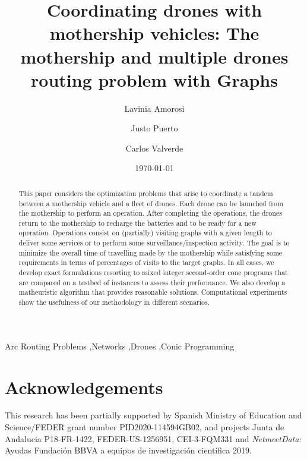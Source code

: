 \documentclass[10pt,a4paper]{elsarticle}
\title{Coordinating drones with mothership vehicles: The mothership and multiple drones routing problem with Graphs}
\author[1]{Lavinia Amorosi\corref{cor1}}
\author[2]{Justo Puerto\corref{cor1}}
\author[2]{Carlos Valverde\corref{cor1}}
\date{\today}
\newcommand{\CV}[1]{{\color{atomictangerine}#1}}
\newcommand{\RE}[1]{{\color{blue}#1}}
\begin{document}
\begin{abstract}
This paper considers the optimization problems that arise to coordinate a tandem between a mothership vehicle and a fleet of drones. %
Each drone can be launched from the mothership to perform an operation. After completing the operations\RE{,} the drones return to the mothership to recharge \RE{the} batteries and to be ready for a new operation. Operations consist on (partially) visiting graphs with \RE{a given length} to deliver some services or to perform some surveillance/inspection activity.  The goal is to minimize the overall \RE{time of travelling made} by the mothership while satisfying some requirements in terms of percentages of visits to the target graphs. In all cases, we develop exact formulations resorting to mixed integer second\CV{-}order cone programs that are compared on a testbed of instances to assess their performance. We also develop a matheuristic algorithm that provides reasonable solutions.  Computational experiments show the usefulness of our \RE{methodology} in different scenarios. 
\end{abstract}

\begin{keyword}
Arc Routing Problems \sep Networks \sep Drones \sep Conic Programming
\end{keyword}


\maketitle



%


%


% 



\section*{Acknowledgements}
This research has been partially supported by Spanish Ministry of Education and Science/FEDER grant number  PID2020-114594GB02, and projects Junta de Andalucia P18-FR-1422, FEDER-US-1256951, CEI-3-FQM331 and  \textit{NetmeetData}: Ayudas Fundaci\'on BBVA a equipos de investigaci\'on cient\'ifica 2019.

% 





\end{document}
